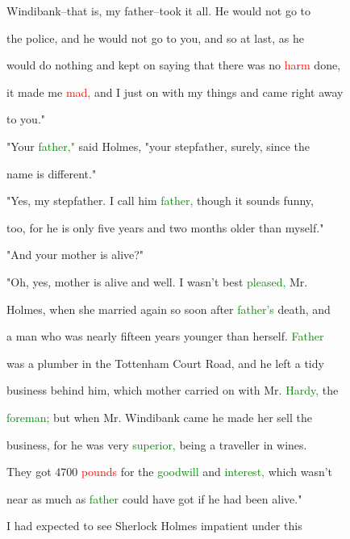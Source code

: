  Windibank--that is, my father--took it all. He would not go to

 the \textcolor{BurntOrange}{police,} and he would not go to you, and so at last, as he

 would do nothing and kept on saying that there was no \textcolor{red}{harm} done,

 it made me \textcolor{red}{mad,} and I just on with my things and came right away

 to you."



 "Your \textcolor{green}{father,"} said Holmes, "your stepfather, surely, since the

 name is different."



 "Yes, my stepfather. I call him \textcolor{green}{father,} though it sounds funny,

 too, for he is only five years and two months older than myself."



 "And your \textcolor{BurntOrange}{mother} is \textcolor{BurntOrange}{alive?"}



 "Oh, yes, \textcolor{BurntOrange}{mother} is \textcolor{BurntOrange}{alive} and well. I wasn't best \textcolor{green}{pleased,} Mr.

 Holmes, when she married again so soon after \textcolor{green}{father's} \textcolor{BurntOrange}{death,} and

 a man who was nearly fifteen years \textcolor{BurntOrange}{younger} than herself. \textcolor{green}{Father}

 was a plumber in the Tottenham \textcolor{BurntOrange}{Court} Road, and he left a tidy

 business behind him, which \textcolor{BurntOrange}{mother} carried on with Mr. \textcolor{green}{Hardy,} the

 \textcolor{green}{foreman;} but when Mr. Windibank came he made her sell the

 business, for he was very \textcolor{green}{superior,} being a traveller in wines.

 They got 4700 \textcolor{red}{pounds} for the \textcolor{green}{goodwill} and \textcolor{green}{interest,} which wasn't

 near as much as \textcolor{green}{father} could have got if he had been \textcolor{BurntOrange}{alive."}



 I had \textcolor{BurntOrange}{expected} to see Sherlock Holmes \textcolor{BurntOrange}{impatient} under this

